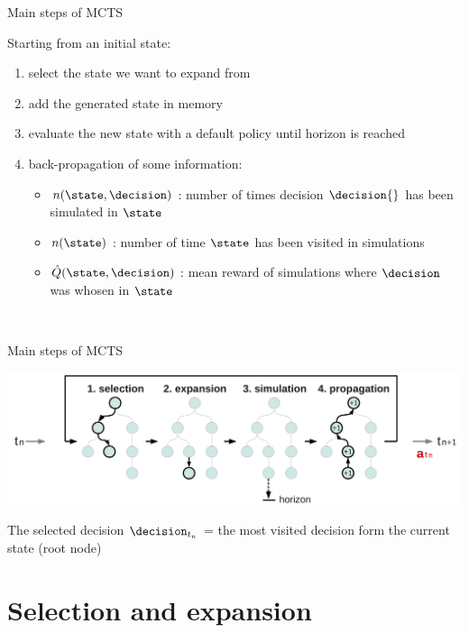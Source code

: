 \begin{frame}{Main steps of MCTS}
{\begin{center}
        \end{center}
    }
    \begin{small}
        Starting from an initial state:%
        \begin{enumerate}
            \item<1-> select the state we want to expand from
            \item<2-> add the generated state in memory
            \item<3-> evaluate the new state with a default policy until horizon is reached
            \item<4-> back-propagation of some information:
            \begin{itemize}
                \item $n(\state,\decision)$ : number of times decision $\decision{}$ has been simulated in $\state$
                \item $n(\state)$ : number of time $\state$ has been visited in simulations
                \item $\hat{Q}(\state,\decision)$ : mean reward of simulations where $\decision$ was whosen in $\state$
            \end{itemize}
        \end{enumerate}
        ~\\
    \end{small}
\end{frame}


\begin{frame}{Main steps of MCTS}
    \begin{center}
        \includegraphics[width=.75\linewidth]{fig/tree10f}
    \end{center}

    \begin{block}{The selected decision}
        $\decision_{t_n}$ = the most visited decision form the current state (root node)
    \end{block}
\end{frame}


\section{Selection and expansion}
